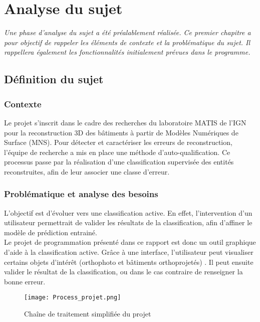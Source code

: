 \chapter[Analyse du sujet]{Analyse du sujet}

\textit{Une phase d'analyse du sujet a été préalablement réalisée. Ce premier chapitre a pour objectif de rappeler les éléments de contexte et la problématique du sujet. Il rappellera également les fonctionnalités initialement prévues dans le programme.}

\section{Définition du sujet}

\subsection{Contexte}

Le projet s’inscrit dans le cadre des recherches du laboratoire MATIS de l'IGN pour la reconstruction 3D des bâtiments à partir de Modèles Numériques de Surface (MNS). Pour détecter et caractériser les erreurs de reconstruction, l’équipe de recherche a mis en place une méthode d’auto-qualification. Ce processus passe par la réalisation d’une classification supervisée des entités reconstruites, afin de leur associer une classe d’erreur.

\subsection{Problématique et analyse des besoins}

L’objectif est d’évoluer vers une classification active. En effet, l’intervention d’un utilisateur permettrait de valider les résultats de la classification, afin d’affiner le modèle de prédiction entrainé.\\

Le projet de programmation présenté dans ce rapport est donc un outil graphique d'aide à la classification active. Grâce à une interface, l'utilisateur peut visualiser certains objets d'intérêt (orthophoto et bâtiments orthoprojetés) . Il peut ensuite valider le résultat de la classification, ou dans le cas contraire de renseigner la bonne erreur.\\

\begin{figure}[!h]
	\begin{center}
		\texttt{[image: Process\_projet.png]}  \\
		\caption[Chaîne de traitement simplifiée du projet]{Chaîne de traitement simplifiée du projet}
		\label{fig:processprojet}
	\end{center}
\end{figure}

